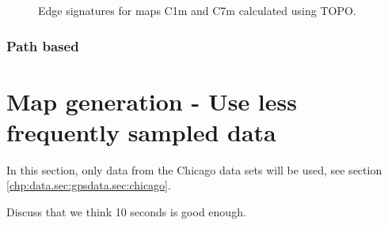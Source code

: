 \begin{figure}[H]%

 
  
 \caption{Edge signatures for maps C1m and C7m calculated using TOPO.}%
 \label{fig:results/sig_topo_1m7m}
\end{figure}

\subsubsection{Path based}




\section{Map generation - Use less frequently sampled data}

In this section, only data from the Chicago data sets will be used, see section \ref{chp:data.sec:gpsdata.sec:chicago}. 

Discuss that we think 10 seconds is good enough.

